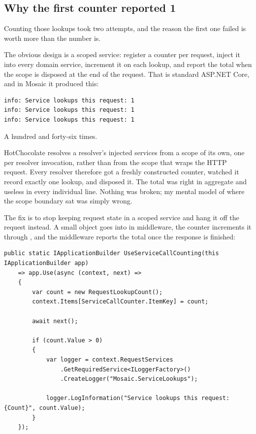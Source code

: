 \subsection*{Why the first counter reported 1}

%
Counting those lookups took two attempts, and the reason the first one failed is
worth more than the number is.

The obvious design is a scoped service: register a counter per request, inject it
into every domain service, increment it on each lookup, and report the total when
the scope is disposed at the end of the request. That is standard ASP.NET Core,
and in Mosaic it produced this:

\begin{verbatim}
info: Service lookups this request: 1
info: Service lookups this request: 1
info: Service lookups this request: 1
\end{verbatim}

A hundred and forty-six times.

HotChocolate resolves a resolver's injected services from a scope of its own,
one per resolver invocation, rather than from the scope that wraps the HTTP
request. Every resolver therefore got a freshly constructed counter, watched it
record exactly one lookup, and disposed it. The total was right in aggregate and
useless in every individual line. Nothing was broken; my mental model of where
the scope boundary sat was simply wrong.

The fix is to stop keeping request state in a scoped service and hang it off the
request instead. A small object goes into  in middleware,
the counter increments it through , and the middleware
reports the total once the response is finished:

\begin{verbatim}
public static IApplicationBuilder UseServiceCallCounting(this IApplicationBuilder app)
    => app.Use(async (context, next) =>
    {
        var count = new RequestLookupCount();
        context.Items[ServiceCallCounter.ItemKey] = count;

        await next();

        if (count.Value > 0)
        {
            var logger = context.RequestServices
                .GetRequiredService<ILoggerFactory>()
                .CreateLogger("Mosaic.ServiceLookups");

            logger.LogInformation("Service lookups this request: {Count}", count.Value);
        }
    });
\end{verbatim}

